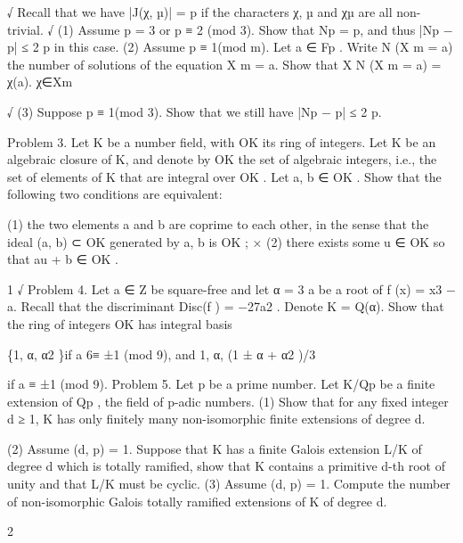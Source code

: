 \documentclass[UTF8,12pt]{ctexart}
\begin{document}
√ Recall that we have |J(χ, µ)| = p if the characters χ, µ and χµ are all non-trivial. √ (1) Assume p = 3 or p ≡ 2 (mod 3). Show that Np = p, and thus |Np − p| ≤ 2 p in this case. (2) Assume p ≡ 1(mod m). Let a ∈ Fp . Write N (X m = a) the number of solutions of the equation X m = a. Show that X N (X m = a) = χ(a). χ∈Xm

√ (3) Suppose p ≡ 1(mod 3). Show that we still have |Np − p| ≤ 2 p.

Problem 3. Let K be a number field, with OK its ring of integers. Let K be an algebraic closure of K, and denote by OK the set of algebraic integers, i.e., the set of elements of K that are integral over OK . Let a, b ∈ OK . Show that the following two conditions are equivalent:

(1) the two elements a and b are coprime to each other, in the sense that the ideal (a, b) ⊂ OK generated by a, b is OK ; × (2) there exists some u ∈ OK so that au + b ∈ OK .

1 √ Problem 4. Let a ∈ Z be square-free and let α = 3 a be a root of f (x) = x3 − a. Recall that the discriminant Disc(f ) = −27a2 . Denote K = Q(α). Show that the ring of integers OK has integral basis

\{1, α, α2 \}if a 6≡ ±1 (mod 9), and 1, α, (1 ± α + α2 )/3

if a ≡ ±1 (mod 9). Problem 5. Let p be a prime number. Let K/Qp be a finite extension of Qp , the field of p-adic numbers. (1) Show that for any fixed integer d ≥ 1, K has only finitely many non-isomorphic finite extensions of degree d.

(2) Assume (d, p) = 1. Suppose that K has a finite Galois extension L/K of degree d which is totally ramified, show that K contains a primitive d-th root of unity and that L/K must be cyclic. (3) Assume (d, p) = 1. Compute the number of non-isomorphic Galois totally ramified extensions of K of degree d.

2
\end{document}
